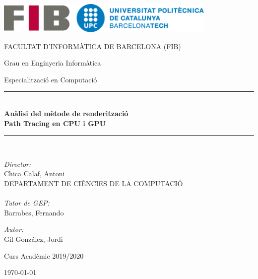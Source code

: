 \newcommand{\HRule}{\rule{\linewidth}{0.5mm}}

\thispagestyle{empty}


\begin{center}

\includegraphics[width=0.8\textwidth]{media/fib2.png}

\large FACULTAT D'INFORMÀTICA DE BARCELONA (FIB)

\large Grau en Enginyeria Informàtica

Especialització en Computació

\vspace{1cm}


\HRule \\[0.4cm]
{
 \LARGE \bfseries \sffamily Anàlisi del mètode de renderització \\ Path Tracing en CPU i GPU  \\[0.4cm] 
}
\HRule \\[0.4cm] 

\normalfont \small {}

\vspace{1.2cm} %


\noindent
\begin{minipage}[t]{0.49\textwidth}
\begin{flushleft} \large
\emph{Director:} \\
Chica Calaf, Antoni\\
\small{DEPARTAMENT DE CIÈNCIES DE LA COMPUTACIÓ} \\
\hfill \\
\large
\emph{Tutor de GEP:} \\
Barrabes, Fernando\\
\end{flushleft}
\end{minipage}
\begin{minipage}[t]{0.49\textwidth}
\begin{flushright}
\large
\emph{Autor:}\\
Gil González, Jordi\\
\end{flushright}
\end{minipage}

\vfill

\large Curs Acadèmic 2019/2020

\large \today

\end{center}

